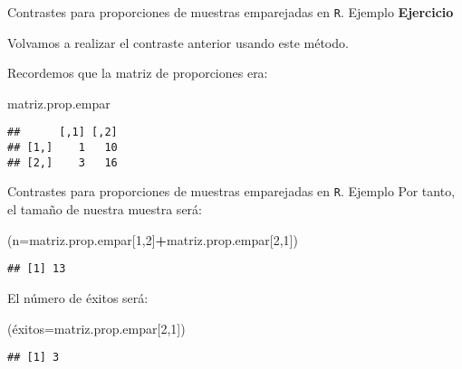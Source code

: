 \documentclass[
  ignorenonframetext,
]{beamer}
\newenvironment{Shaded}{\begin{snugshade}}{\end{snugshade}}
\newcommand{\DataTypeTok}[1]{\textcolor[rgb]{0.13,0.29,0.53}{#1}}
\newcommand{\DecValTok}[1]{\textcolor[rgb]{0.00,0.00,0.81}{#1}}
\newcommand{\NormalTok}[1]{#1}
\newcommand{\OperatorTok}[1]{\textcolor[rgb]{0.81,0.36,0.00}{\textbf{#1}}}
\begin{document}
\begin{frame}[fragile]{Contrastes para proporciones de muestras
emparejadas en \texttt{R}. Ejemplo}
\protect\hypertarget{contrastes-para-proporciones-de-muestras-emparejadas-en-r.-ejemplo-5}{}
\textbf{Ejercicio}

Volvamos a realizar el contraste anterior usando este método.

Recordemos que la matriz de proporciones era:

\begin{Shaded}
\begin{Highlighting}[]
\NormalTok{matriz.prop.empar}
\end{Highlighting}
\end{Shaded}

\begin{verbatim}
##      [,1] [,2]
## [1,]    1   10
## [2,]    3   16
\end{verbatim}
\end{frame}

\begin{frame}[fragile]{Contrastes para proporciones de muestras
emparejadas en \texttt{R}. Ejemplo}
\protect\hypertarget{contrastes-para-proporciones-de-muestras-emparejadas-en-r.-ejemplo-6}{}
Por tanto, el tamaño de nuestra muestra será:

\begin{Shaded}
\begin{Highlighting}[]
\NormalTok{(}\DataTypeTok{n=}\NormalTok{matriz.prop.empar[}\DecValTok{1}\NormalTok{,}\DecValTok{2}\NormalTok{]}\OperatorTok{+}\NormalTok{matriz.prop.empar[}\DecValTok{2}\NormalTok{,}\DecValTok{1}\NormalTok{])}
\end{Highlighting}
\end{Shaded}

\begin{verbatim}
## [1] 13
\end{verbatim}

El número de éxitos será:

\begin{Shaded}
\begin{Highlighting}[]
\NormalTok{(é}\DataTypeTok{xitos=}\NormalTok{matriz.prop.empar[}\DecValTok{2}\NormalTok{,}\DecValTok{1}\NormalTok{])}
\end{Highlighting}
\end{Shaded}

\begin{verbatim}
## [1] 3
\end{verbatim}
\end{frame}
\end{document}
